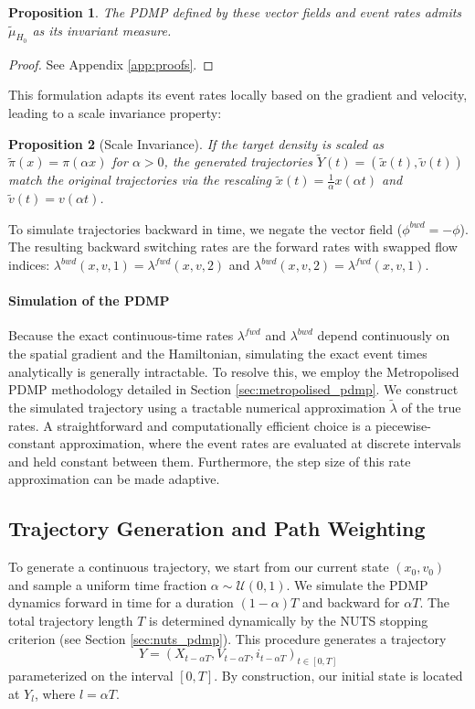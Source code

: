 \documentclass{article}
\newtheorem{proposition}{Proposition}
\begin{document}
\begin{proposition}
    The PDMP defined by these vector fields and event rates admits $\tilde{\mu}_{H_0}$ as its invariant measure.
\end{proposition}
\begin{proof}
    See Appendix \ref{app:proofs}.
\end{proof}

This formulation adapts its event rates locally based on the gradient and velocity, leading to a scale invariance property:
\begin{proposition}[Scale Invariance]
    \label{prop:scale-invariance}
    If the target density is scaled as $\tilde{\pi}(x) = \pi(\alpha x)$ for $\alpha > 0$, the generated trajectories $\tilde{Y}(t) = (\tilde{x}(t), \tilde{v}(t))$ match the original trajectories via the rescaling $\tilde{x}(t) = \frac{1}{\alpha} x(\alpha t)$ and $\tilde{v}(t) = v(\alpha t)$.
\end{proposition}

To simulate trajectories backward in time, we negate the vector field ($\phi^{bwd} = -\phi$). The resulting backward switching rates are the forward rates with swapped flow indices: $\lambda^{bwd}(x, v,1) = \lambda^{fwd}(x,v,2)$ and $\lambda^{bwd}(x, v,2) = \lambda^{fwd}(x,v,1)$.

\paragraph{Simulation of the PDMP}
Because the exact continuous-time rates $\lambda^{fwd}$ and $\lambda^{bwd}$ depend continuously on the spatial gradient and the Hamiltonian, simulating the exact event times analytically is generally intractable. To resolve this, we employ the Metropolised PDMP methodology detailed in Section \ref{sec:metropolised_pdmp}. We construct the simulated trajectory using a tractable numerical approximation $\tilde{\lambda}$ of the true rates. A straightforward and computationally efficient choice is a piecewise-constant approximation, where the event rates are evaluated at discrete intervals and held constant between them. Furthermore, the step size of this rate approximation can be made adaptive.


\subsection{Trajectory Generation and Path Weighting}
\label{sec:sampling_w_t}

To generate a continuous trajectory, we start from our current state $(x_0, v_0)$ and sample a uniform time fraction $\alpha \sim \mathcal{U}(0, 1)$. We simulate the PDMP dynamics forward in time for a duration $(1-\alpha)T$ and backward for $\alpha T$. The total trajectory length $T$ is determined dynamically by the NUTS stopping criterion (see Section \ref{sec:nuts_pdmp}).
This procedure generates a trajectory 
\[
    Y = (X_{t-\alpha T},V_{t-\alpha T},i_{t-\alpha T})_{t\in [0,T]}
\]
parameterized on the interval $[0, T]$. By construction, our initial state is located at $Y_l$, where $l = \alpha T$. 
\end{document}

